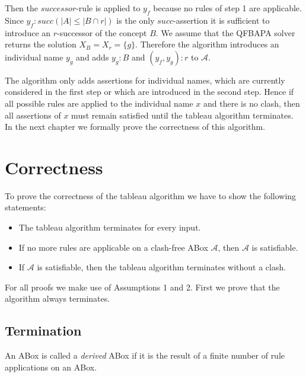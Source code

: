 \documentclass{book}
\theoremstyle{break}
\theoremstyle{definition}
\begin{document}
Then the $successor$-rule is applied to $y_f$ because no rules of step 1 are applicable. Since $y_f:succ(|A|\leq |B\cap r|)$ is the only $succ$-assertion it is sufficient to introduce an $r$-successor of the concept $B$. We assume that the QFBAPA solver returns the solution $X_B=X_r=\{g\}$. Therefore the algorithm introduces an individual name $y_g$ and adds $y_g:B$ and $(y_f,y_g):r$ to $\mathcal{A}$.
\begin{figure}[H]
\centering
{}
\end{figure}
The algorithm only adds assertions for individual names, which are currently considered in the first step or which are introduced in the second step. Hence if all possible rules are applied to the individual name $x$ and there is no clash, then all assertions of $x$ must remain satisfied until the tableau algorithm terminates. In the next chapter we formally prove the correctness of this algorithm.
\chapter{Correctness}
To prove the correctness of the tableau algorithm we have to show the following statements:
\begin{itemize}
\item The tableau algorithm terminates for every input.
\item If no more rules are applicable on a clash-free ABox $\mathcal{A}$, then $\mathcal{A}$ is satisfiable.
\item If $\mathcal{A}$ is satisfiable, then the tableau algorithm terminates without a clash.
\end{itemize}
For all proofs we make use of Assumptions 1 and 2. First we prove that the algorithm always terminates.
\section{Termination}
An ABox is called a \textit{derived} ABox if it is the result of a finite number of rule applications on an ABox. \\
\end{document}
